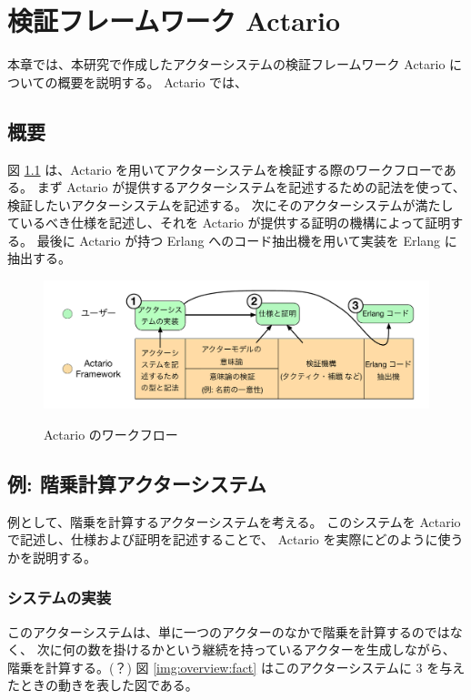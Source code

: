 \chapter{検証フレームワーク Actario}
\label{chapter:overview}

本章では、本研究で作成したアクターシステムの検証フレームワーク Actario についての概要を説明する。
Actario では、

\section{概要}

図 \ref{img:overview:workflow} は、Actario を用いてアクターシステムを検証する際のワークフローである。
まず Actario が提供するアクターシステムを記述するための記法を使って、検証したいアクターシステムを記述する。
次にそのアクターシステムが満たしているべき仕様を記述し、それを Actario が提供する証明の機構によって証明する。
最後に Actario が持つ Erlang へのコード抽出機を用いて実装を Erlang に抽出する。

\begin{figure}[tp]
  \includegraphics[width=14cm]{./img/overview/workflow.pdf}
  \label{img:overview:workflow}
  \caption{Actario のワークフロー}
\end{figure}

\section{例: 階乗計算アクターシステム}

例として、階乗を計算するアクターシステムを考える。
このシステムを Actario で記述し、仕様および証明を記述することで、
Actario を実際にどのように使うかを説明する。

\subsection{システムの実装}

このアクターシステムは、単に一つのアクターのなかで階乗を計算するのではなく、
次に何の数を掛けるかという継続を持っているアクターを生成しながら、
階乗を計算する。(？)
図 \ref{img:overview:fact} はこのアクターシステムに $3$ を与えたときの動きを表した図である。

